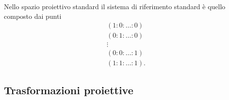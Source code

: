 \documentclass[11pt]{scrartcl}
\begin{document}
   	 \begin{definition}
   	 	Nello spazio proiettivo standard il sistema di riferimento standard è quello composto dai punti
   	 	\begin{gather*}
   	 		(1:0:\dots:0) \\
   	 		(0:1:\dots:0) \\
   	 		\vdots \\
   	 		(0:0:\dots:1) \\
   	 		(1:1:\dots:1).
   	 	\end{gather*}
   	 	
   	 \end{definition}
   	 \newpage
   	 \subsection{Trasformazioni proiettive}
   	 
\end{document}
